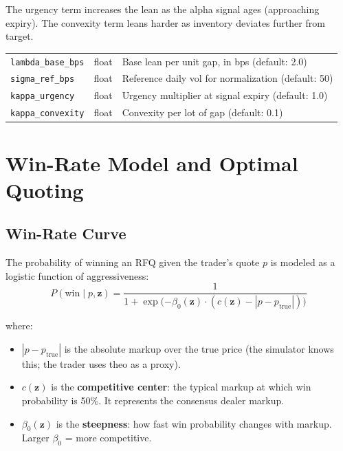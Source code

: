 \documentclass[11pt,a4paper]{article}
\begin{document}
The urgency term increases the lean as the alpha signal ages (approaching expiry). The convexity term leans harder as inventory deviates further from target.

\begin{parambox}[Knobs]
\begin{tabular}{@{}lll@{}}
\texttt{lambda\_base\_bps} & float & Base lean per unit gap, in bps (default: 2.0) \\
\texttt{sigma\_ref\_bps} & float & Reference daily vol for normalization (default: 50) \\
\texttt{kappa\_urgency} & float & Urgency multiplier at signal expiry (default: 1.0) \\
\texttt{kappa\_convexity} & float & Convexity per lot of gap (default: 0.1) \\
\end{tabular}
\end{parambox}


\section{Win-Rate Model and Optimal Quoting}\label{sec:quoting}

\subsection{Win-Rate Curve}

The probability of winning an RFQ given the trader's quote $p$ is modeled as a logistic function of aggressiveness:
\begin{equation}
P(\text{win} \mid p, \mathbf{z}) = \frac{1}{1 + \exp\!\big({-\beta_0(\mathbf{z}) \cdot (c(\mathbf{z}) - |p - p_{\text{true}}|)}\big)}
\end{equation}

where:
\begin{itemize}[leftmargin=2em]
  \item $|p - p_{\text{true}}|$ is the absolute markup over the true price (the simulator knows this; the trader uses theo as a proxy).
  \item $c(\mathbf{z})$ is the \textbf{competitive center}: the typical markup at which win probability is 50\%. It represents the consensus dealer markup.
  \item $\beta_0(\mathbf{z})$ is the \textbf{steepness}: how fast win probability changes with markup. Larger $\beta_0$ = more competitive.
\end{itemize}
\end{document}
